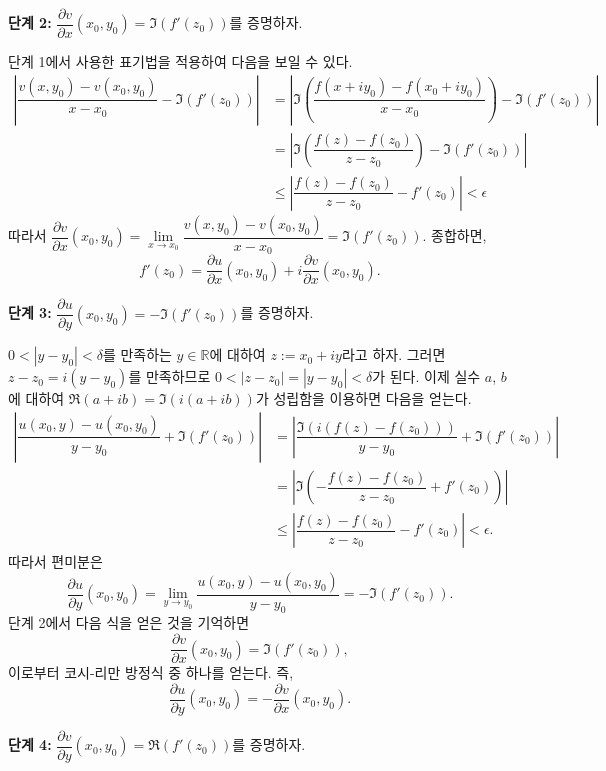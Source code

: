 {\bf 단계 2:}
$\dfrac{\partial v}{\partial x}(x_0, y_0)  = \Im(f'(z_0))$를 증명하자.

단계 1에서 사용한 표기법을 적용하여 다음을 보일 수 있다.
\begin{align*}
\left| \dfrac{v(x,y_0) - v(x_0, y_0)}{x-x_0} - \Im(f'(z_0)) \right| 
&= \left| \Im\left(\dfrac{f(x+iy_0)-f(x_0+iy_0)}{x-x_0}\right) - \Im(f'(z_0)) \right| \\
&= \left| \Im\left(\dfrac{f(z)-f(z_0)}{z-z_0}\right) - \Im(f'(z_0)) \right| \\
&\le \left| \dfrac{f(z)-f(z_0)}{z-z_0} - f'(z_0) \right| < \epsilon 
\end{align*}
따라서
$\dfrac{\partial v}{\partial x}(x_0, y_0) 
= \lim\limits_{x\to x_0} \dfrac{v(x,y_0) - v(x_0, y_0)}{x-x_0} 
= \Im(f'(z_0))$. 종합하면,
\begin{equation}\label{eq-2-5}
f'(z_0) = \dfrac{\partial u}{\partial x}(x_0, y_0)
+ i \dfrac{\partial v}{\partial x}(x_0, y_0).
\end{equation}

{\bf  단계 3:}
$\dfrac{\partial u}{\partial y}(x_0, y_0)  = - \Im(f'(z_0))$를 증명하자.

$0<|y-y_0|<\delta$를 만족하는 $y\in\mathbb R$에 대하여 $z:=x_0+iy$라고 하자.
그러면 $z-z_0 = i(y-y_0)$를 만족하므로
$0< |z-z_0| = |y-y_0| <\delta$가 된다.
이제 실수 $a$, $b$에 대하여
$\Re(a+ib) = \Im(i(a+ib))$가 성립함을 이용하면 다음을 얻는다.
\begin{align*}
\left| \dfrac{u(x_0,y) - u(x_0, y_0)}{y-y_0} + \Im(f'(z_0)) \right| 
&= \left| \dfrac{\Im(i(f(z)-f(z_0)))}{y-y_0} + \Im(f'(z_0)) \right| \\
&= \left| \Im\left(-\dfrac{f(z)-f(z_0)}{z-z_0} +f'(z_0) \right) \right| \\
&\le \left| \dfrac{f(z)-f(z_0)}{z-z_0} - f'(z_0) \right| < \epsilon .
\end{align*}
따라서 편미분은
$$
\dfrac{\partial u}{\partial y}(x_0, y_0) 
= \lim\limits_{y\to y_0} \dfrac{u(x_0,y) - u(x_0, y_0)}{y-y_0} 
= -\Im(f'(z_0)).
$$
단계 2에서 다음 식을 얻은 것을 기억하면
$$
\dfrac{\partial v}{\partial x}(x_0, y_0) 
= \Im(f'(z_0)),
$$
이로부터 코시-리만 방정식 중 하나를 얻는다. 즉,
$$
\dfrac{\partial u}{\partial y}(x_0, y_0) = - \dfrac{\partial v}{\partial x}(x_0, y_0).
$$

{\bf 단계 4:}
$\dfrac{\partial v}{\partial y}(x_0, y_0)  = \Re(f'(z_0))$를 증명하자.

